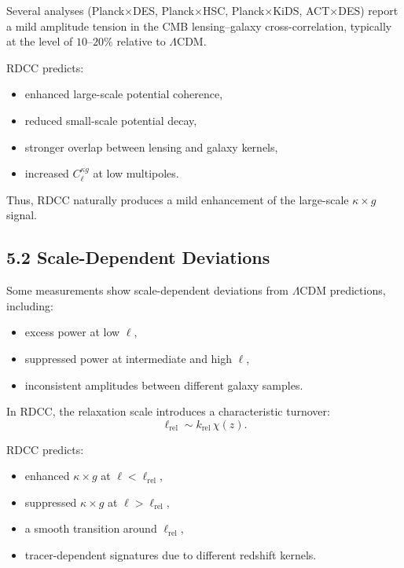 \documentclass[11pt,a4paper]{article}
\begin{document}
Several analyses (Planck×DES, Planck×HSC, Planck×KiDS, ACT×DES) report a mild amplitude 
tension in the CMB lensing–galaxy cross-correlation, typically at the level of 
$10$--$20\%$ relative to $\Lambda$CDM.

RDCC predicts:

\begin{itemize}
    \item enhanced large-scale potential coherence,
    \item reduced small-scale potential decay,
    \item stronger overlap between lensing and galaxy kernels,
    \item increased $C_{\ell}^{\kappa g}$ at low multipoles.
\end{itemize}

Thus, RDCC naturally produces a mild enhancement of the large-scale $\kappa \times g$ signal.

\subsection*{5.2 Scale-Dependent Deviations}

Some measurements show scale-dependent deviations from $\Lambda$CDM predictions, including:

\begin{itemize}
    \item excess power at low $\ell$,
    \item suppressed power at intermediate and high $\ell$,
    \item inconsistent amplitudes between different galaxy samples.
\end{itemize}

In RDCC, the relaxation scale introduces a characteristic turnover:
\begin{equation}
    \ell_{\mathrm{rel}}
    \sim k_{\mathrm{rel}}\,\chi(z).
\end{equation}

RDCC predicts:

\begin{itemize}
    \item enhanced $\kappa \times g$ at $\ell < \ell_{\mathrm{rel}}$,
    \item suppressed $\kappa \times g$ at $\ell > \ell_{\mathrm{rel}}$,
    \item a smooth transition around $\ell_{\mathrm{rel}}$,
    \item tracer-dependent signatures due to different redshift kernels.
\end{itemize}
\end{document}
